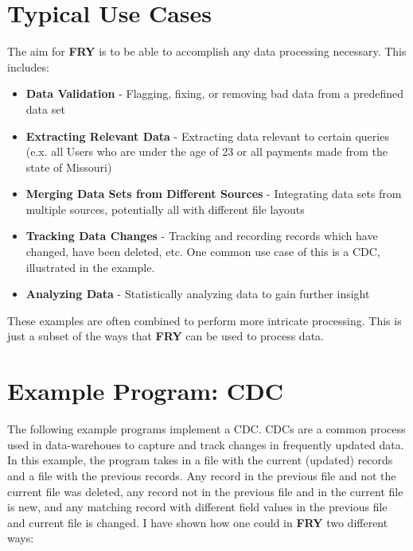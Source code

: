 \documentclass{article}
\begin{document}
\section{Typical Use Cases}
The aim for \textbf{FRY} is to be able to accomplish any data processing necessary. This includes:

\begin{itemize}

\item \textbf{Data Validation} - Flagging, fixing, or removing bad data from a predefined data set

\item \textbf{Extracting Relevant Data} - Extracting data relevant to certain queries (e.x. all Users who are under the age of 23 or all payments made from the state of Missouri)

\item \textbf{Merging Data Sets from Different Sources} - Integrating data sets from multiple sources, potentially all with different file layouts

\item \textbf{Tracking Data Changes} - Tracking and recording records which have changed, have been deleted, etc. One common use case of this is a CDC, illustrated in the example.

\item \textbf{Analyzing Data} - Statistically analyzing data to gain further insight

\end{itemize}

These examples are often combined to perform more intricate processing. This is just a subset of the ways that \textbf{FRY} can be used to process data.

\section{Example Program: CDC}

The following example programs implement a CDC. CDCs are a common process used in data-warehoues to capture and track changes in frequently updated data. In this example, the program takes in a file with the current (updated) records and a file with the previous records. Any record in the previous file and not the current file was deleted, any record not in the previous file and in the current file is new, and any matching record with different field values in the previous file and current file is changed. I have shown how one could in \textbf{FRY} two different ways:
\end{document}
